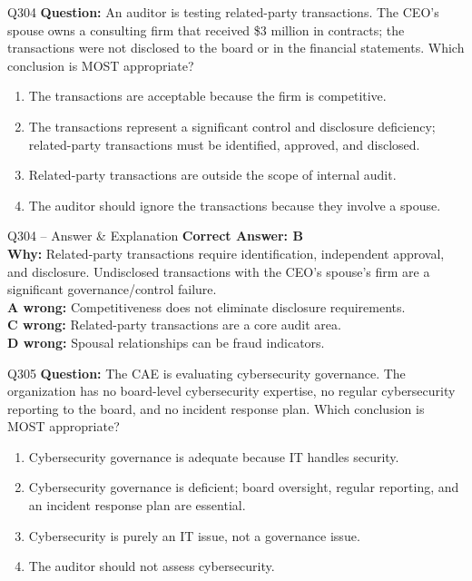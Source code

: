 \documentclass[aspectratio=169,10pt]{beamer}
\begin{document}
	\begin{frame}[t]{Q304}
		\small
		\textbf{Question:} An auditor is testing related-party transactions. The CEO's spouse owns a consulting firm that received \$3 million in contracts; the transactions were not disclosed to the board or in the financial statements. Which conclusion is MOST appropriate?
		\begin{enumerate}[label=\Alph*.,itemsep=1pt,topsep=2pt]
			\item The transactions are acceptable because the firm is competitive.
			\item The transactions represent a significant control and disclosure deficiency; related-party transactions must be identified, approved, and disclosed.
			\item Related-party transactions are outside the scope of internal audit.
			\item The auditor should ignore the transactions because they involve a spouse.
		\end{enumerate}
	\end{frame}
	
	\begin{frame}[t]{Q304 -- Answer \& Explanation}
		\small
		\textbf{Correct Answer: B} \\[4pt]
		\textbf{Why:} Related-party transactions require identification, independent approval, and disclosure. Undisclosed transactions with the CEO's spouse's firm are a significant governance/control failure. \\[4pt]
		\textbf{A wrong:} Competitiveness does not eliminate disclosure requirements. \\[2pt]
		\textbf{C wrong:} Related-party transactions are a core audit area. \\[2pt]
		\textbf{D wrong:} Spousal relationships can be fraud indicators.
	\end{frame}
	
	\begin{frame}[t]{Q305}
		\small
		\textbf{Question:} The CAE is evaluating cybersecurity governance. The organization has no board-level cybersecurity expertise, no regular cybersecurity reporting to the board, and no incident response plan. Which conclusion is MOST appropriate?
		\begin{enumerate}[label=\Alph*.,itemsep=1pt,topsep=2pt]
			\item Cybersecurity governance is adequate because IT handles security.
			\item Cybersecurity governance is deficient; board oversight, regular reporting, and an incident response plan are essential.
			\item Cybersecurity is purely an IT issue, not a governance issue.
			\item The auditor should not assess cybersecurity.
		\end{enumerate}
	\end{frame}
	
\end{document}
